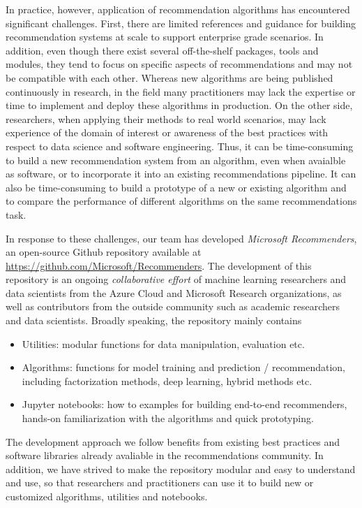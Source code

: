 In practice, however, application of recommendation algorithms has encountered significant challenges. 
First, there are limited references and guidance for building recommendation systems at scale to support
enterprise grade scenarios. In addition, even though there exist several off-the-shelf packages, tools and modules, they tend to focus on specific aspects of recommendations 
and may not be compatible with each other. Whereas new algorithms are being published continuously in research, in the field many practitioners may lack the 
expertise or time to implement and deploy these algorithms in production. On the other side, researchers, when applying their methods to real world scenarios, may lack experience of the domain of interest
or awareness of the best practices with respect to data science and software engineering. Thus, it can be time-consuming to build a new recommendation system from an
algorithm, even when avaialble as software, or to incorporate it into an existing recommendations pipeline. It can also be time-consuming to build a prototype of a new or existing algorithm and to 
compare the performance of different algorithms on the same recommendations task. 

In response to these challenges, our team has developed {\em Microsoft Recommenders}, an open-source 
Github repository available at \url{https://github.com/Microsoft/Recommenders}.
The development of this repository is an ongoing {\em collaborative effort} of machine learning researchers and data scientists from the 
Azure Cloud and Microsoft Research organizations, as well as contributors from the outside community such as academic researchers and data scientists.
Broadly speaking, the repository mainly contains 
\begin{itemize}
\item
Utilities: modular functions for data manipulation, evaluation etc.
\item
Algorithms: functions for model training and prediction / recommendation, including factorization methods, deep learning, hybrid methods etc.
\item
Jupyter notebooks: how to examples for building end-to-end recommenders, hands-on familiarization with the algorithms and quick prototyping. 
\end{itemize}
The development approach we follow benefits from existing best practices and software libraries already avaliable in the recommendations community.
In addition, we have strived to make the repository modular and easy to understand and use, so that researchers and practitioners can use it to build
new or customized algorithms, utilities and notebooks.

